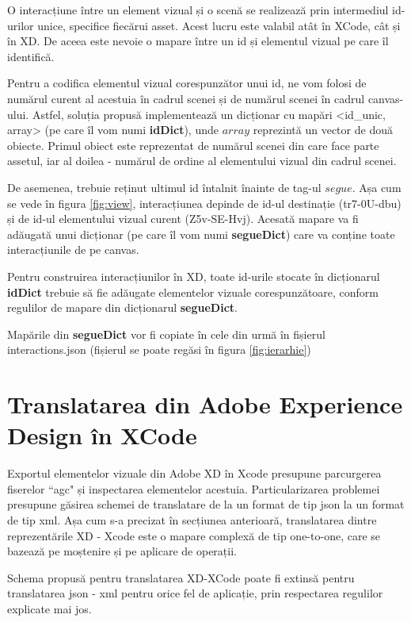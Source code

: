 O interacțiune între un element vizual și o scenă se realizează prin intermediul id-urilor unice, specifice fiecărui asset. Acest lucru este valabil atât în XCode, cât și în XD. De aceea este nevoie o mapare între un id și elementul vizual pe care îl identifică. 

Pentru a codifica elementul vizual corespunzător unui id, ne vom folosi de numărul curent al acestuia în cadrul scenei și de numărul scenei în cadrul canvas-ului. Astfel, soluția propusă implementează un dicționar cu mapări <id_unic, array> (pe care îl vom numi \textbf{idDict}), unde $array$ reprezintă un vector de două obiecte. Primul obiect este reprezentat de numărul scenei din care face parte assetul, iar al doilea - numărul de ordine al elementului vizual din cadrul scenei.

De asemenea, trebuie reținut ultimul id întalnit înainte de tag-ul $segue$. Așa cum se vede în figura \ref{fig:view}, interacțiunea depinde de id-ul destinație (tr7-0U-dbu) și de id-ul elementului vizual curent (Z5v-SE-Hvj). Acesată mapare va fi adăugată unui dicționar (pe care îl vom numi \textbf{segueDict}) care va conține toate interacțiunile de pe canvas.

Pentru construirea interacțiunilor în XD, toate id-urile stocate în dicționarul \textbf{idDict} trebuie să fie adăugate elementelor vizuale corespunzătoare, conform regulilor de mapare din dicționarul \textbf{segueDict}.

Mapările din \textbf{segueDict} vor fi copiate în cele din urmă în fișierul interactions.json (fișierul se poate regăsi în figura \ref{fig:ierarhie})

\section{Translatarea din Adobe Experience Design în XCode}

Exportul elementelor vizuale din Adobe XD în Xcode presupune parcurgerea fiserelor ``agc" și inspectarea elementelor acestuia. Particularizarea problemei presupune găsirea schemei de translatare de la un format de tip json la un format de tip xml. Așa cum s-a precizat în secțiunea anterioară, translatarea dintre reprezentările XD - Xcode este o mapare complexă de tip one-to-one, care se bazează pe moștenire și pe aplicare de operații. 

Schema propusă pentru translatarea XD-XCode poate fi extinsă pentru translatarea json - xml pentru orice fel de aplicație, prin respectarea regulilor explicate mai jos. 

